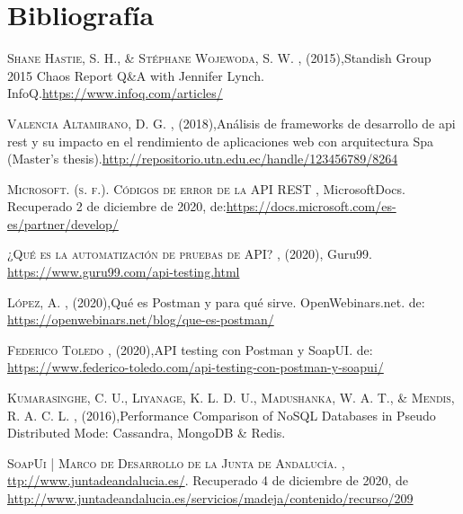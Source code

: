 \documentclass[twocolumn]{article}
\begin{document}
    


\section{Bibliografía}

\begin{thebibliography}{X}
  
  
   \textsc{Shane Hastie, S. H., \& Stéphane Wojewoda, S. W.} ,
  \textit{}(2015),Standish Group 2015 Chaos Report \- Q\&A with Jennifer Lynch. InfoQ.\url{https://www.infoq.com/articles/}
  
   \textsc{Valencia Altamirano, D. G. } ,
  \textit{}(2018),Análisis de frameworks de desarrollo de api rest y su impacto en el rendimiento de aplicaciones web con arquitectura Spa (Master's thesis).\url{http://repositorio.utn.edu.ec/handle/123456789/8264}

   \textsc{Microsoft. (s. f.). Códigos de error de la API REST} ,
  \textit{}MicrosoftDocs. Recuperado 2 de diciembre de 2020, de:\url{https://docs.microsoft.com/es-es/partner/develop/}

   \textsc{¿Qué es la automatización de pruebas de API?} ,
  \textit{}(2020), Guru99.  \url{https://www.guru99.com/api-testing.html}

   \textsc{López, A.} ,
  \textit{}(2020),Qué es Postman y para qué sirve. OpenWebinars.net. de: \url{https://openwebinars.net/blog/que-es-postman/}

   \textsc{Federico Toledo } ,
  \textit{}(2020),API testing con Postman y SoapUI. de: \url{https://www.federico-toledo.com/api-testing-con-postman-y-soapui/}

   \textsc{Kumarasinghe, C. U., Liyanage, K. L. D. U., Madushanka, W. A. T., \& Mendis, R. A. C. L. } ,
  \textit{}(2016),Performance Comparison of NoSQL Databases in Pseudo Distributed Mode: Cassandra, MongoDB \& Redis.

\newpage
   \textsc{SoapUi | Marco de Desarrollo de la Junta de Andalucía. } ,
  \textit{}\url{ttp://www.juntadeandalucia.es/}. Recuperado 4 de diciembre de 2020, de \url{http://www.juntadeandalucia.es/servicios/madeja/contenido/recurso/209}

\end{thebibliography}
\end{document}
